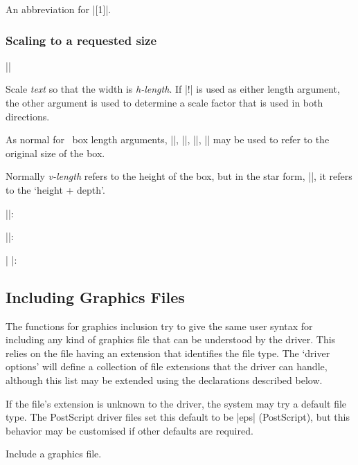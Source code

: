 An abbreviation for |\scalebox{-1}[1]|.

\subsubsection{Scaling to a requested size}

\begin{decl}
|\resizebox|\star{}
\end{decl}

 Scale \emph{text} so that the width is \emph{h-length}.
 If |!| is used as either length argument, the other argument is used
 to determine a scale factor that is used in both directions.

 As normal for \LaTeXe\ box length arguments, |\height|,
 |\width|, |\totalheight|, |\depth| may be used to refer to the
 original size of the box.

 Normally \emph{v-length} refers to the height of the box, but in the
 star form, |\resizebox*|, it refers to the `height +  depth'.

||:

||:

| |:
 

\subsection{Including Graphics Files}
The functions for graphics inclusion try to give the same user syntax
for including any kind of graphics file that can be understood by the
driver. This relies on the file having an extension that identifies
the file type. The `driver options' will define a collection of file
extensions that the driver can handle, although this list may be
extended using the declarations described below.

If the file's extension is unknown to the driver, the system may try a
default file type. The PostScript driver files set this default to be
|eps| (PostScript), but this behavior may be customised if other
defaults are required.

 Include a graphics file.

